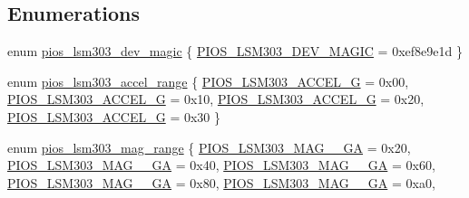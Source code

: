 \subsection*{\-Enumerations}
\begin{DoxyCompactItemize}
\item 
enum \hyperlink{group___p_i_o_s___l_s_m303_ga541e751cf6c930fc56ab31e10b857a74}{pios\-\_\-lsm303\-\_\-dev\-\_\-magic} \{ \hyperlink{group___p_i_o_s___l_s_m303_gga541e751cf6c930fc56ab31e10b857a74a41c2c7ef1afe6e72780e4cbc0eb274d6}{\-P\-I\-O\-S\-\_\-\-L\-S\-M303\-\_\-\-D\-E\-V\-\_\-\-M\-A\-G\-I\-C} =  0xef8e9e1d
 \}
\item 
enum \hyperlink{group___p_i_o_s___l_s_m303_gafbb0e59427f40a8d9b0e901af02bb7b3}{pios\-\_\-lsm303\-\_\-accel\-\_\-range} \{ \hyperlink{group___p_i_o_s___l_s_m303_ggafbb0e59427f40a8d9b0e901af02bb7b3a27dfa9deebf2dde3af39a5befaec680b}{\-P\-I\-O\-S\-\_\-\-L\-S\-M303\-\_\-\-A\-C\-C\-E\-L\-\_\-G} =  0x00, 
\hyperlink{group___p_i_o_s___l_s_m303_ggafbb0e59427f40a8d9b0e901af02bb7b3a17ae55c78fa45d2ce30ed46e9e2f9a00}{\-P\-I\-O\-S\-\_\-\-L\-S\-M303\-\_\-\-A\-C\-C\-E\-L\-\_\-G} =  0x10, 
\hyperlink{group___p_i_o_s___l_s_m303_ggafbb0e59427f40a8d9b0e901af02bb7b3a9535d578ca9f6242eab4d401727a209d}{\-P\-I\-O\-S\-\_\-\-L\-S\-M303\-\_\-\-A\-C\-C\-E\-L\-\_\-G} =  0x20, 
\hyperlink{group___p_i_o_s___l_s_m303_ggafbb0e59427f40a8d9b0e901af02bb7b3a964aeb7da75de6e7dd39e0007b3385b9}{\-P\-I\-O\-S\-\_\-\-L\-S\-M303\-\_\-\-A\-C\-C\-E\-L\-\_\-G} =  0x30
 \}
\item 
enum \hyperlink{group___p_i_o_s___l_s_m303_ga24737af5b503329ca628b921e32ec8d8}{pios\-\_\-lsm303\-\_\-mag\-\_\-range} \{ \*
\hyperlink{group___p_i_o_s___l_s_m303_gga24737af5b503329ca628b921e32ec8d8a78d5f0759823530a8bc4b6ad007ca51a}{\-P\-I\-O\-S\-\_\-\-L\-S\-M303\-\_\-\-M\-A\-G\-\_\-\_\-G\-A} =  0x20, 
\hyperlink{group___p_i_o_s___l_s_m303_gga24737af5b503329ca628b921e32ec8d8a4f6e30669e9fe7926bb28fb4e3192262}{\-P\-I\-O\-S\-\_\-\-L\-S\-M303\-\_\-\-M\-A\-G\-\_\-\_\-G\-A} =  0x40, 
\hyperlink{group___p_i_o_s___l_s_m303_gga24737af5b503329ca628b921e32ec8d8aa3503800030f5377ad55bce47498f260}{\-P\-I\-O\-S\-\_\-\-L\-S\-M303\-\_\-\-M\-A\-G\-\_\-\_\-G\-A} =  0x60, 
\hyperlink{group___p_i_o_s___l_s_m303_gga24737af5b503329ca628b921e32ec8d8a3a95154f97aab91f26efaa1a2fd8992f}{\-P\-I\-O\-S\-\_\-\-L\-S\-M303\-\_\-\-M\-A\-G\-\_\-\_\-G\-A} =  0x80, 
\*
\hyperlink{group___p_i_o_s___l_s_m303_gga24737af5b503329ca628b921e32ec8d8a3d37bcb89bd4512b249617ec810bb6cb}{\-P\-I\-O\-S\-\_\-\-L\-S\-M303\-\_\-\-M\-A\-G\-\_\-\_\-G\-A} =  0xa0, 

\end{DoxyCompactItemize}
